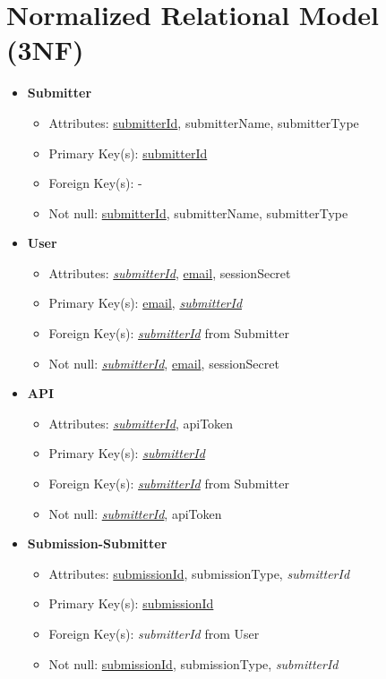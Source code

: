 \documentclass{article}
\begin{document}
\section{Normalized Relational Model (3NF)}
    \begin{itemize}
        \item \textbf{Submitter}        
        \begin{itemize}
            \item Attributes: \underline{submitterId}, submitterName, submitterType
            \item Primary Key(s): \underline{submitterId}
            \item Foreign Key(s): -
            \item Not null: \underline{submitterId}, submitterName, submitterType
        \end{itemize}

        \item \textbf{User}
        \begin{itemize}
            \item Attributes: \underline{\textit{submitterId}}, \underline{email}, sessionSecret
            \item Primary Key(s): \underline{email}, \underline{\textit{submitterId}}
            \item Foreign Key(s): \underline{\textit{submitterId}} from Submitter
            \item Not null: \underline{\textit{submitterId}}, \underline{email}, sessionSecret
        \end{itemize}

        \item \textbf{API}
        \begin{itemize}
            \item Attributes: \underline{\textit{submitterId}}, apiToken
            \item Primary Key(s): \underline{\textit{submitterId}}
            \item Foreign Key(s): \underline{\textit{submitterId}} from Submitter
            \item Not null: \underline{\textit{submitterId}}, apiToken
        \end{itemize}

        \item \textbf{Submission-Submitter}
        \begin{itemize}
            \item Attributes: \underline{submissionId}, submissionType, \textit{submitterId}
            \item Primary Key(s): \underline{submissionId}
            \item Foreign Key(s): \textit{submitterId} from User
            \item Not null: \underline{submissionId}, submissionType, \textit{submitterId}
        \end{itemize}


\end{itemize}
\end{document}
